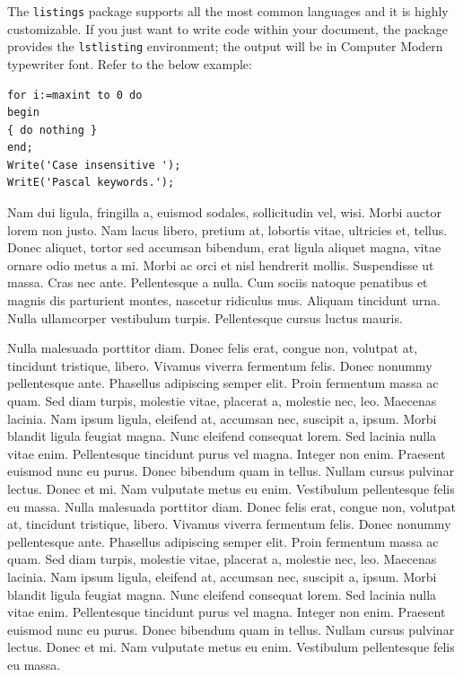 \documentclass[APA,Times1COL]{WileyNJDv5} %
\begin{document}
The {\tt listings} package supports all the most common languages and it is highly customizable. If you just want to write code within your document, the package provides the {\tt lstlisting} environment; the output will be in Computer Modern typewriter font. Refer to the below example:


\begin{lstlisting}[caption={Descriptive caption text},label=DescriptiveLabel, basicstyle=\fontsize{8}{10}\selectfont\ttfamily]
for i:=maxint to 0 do
begin
{ do nothing }
end;
Write('Case insensitive ');
WritE('Pascal keywords.');
\end{lstlisting}




Nam dui ligula, fringilla a, euismod sodales, sollicitudin vel, wisi. Morbi auctor lorem non justo. Nam lacus libero,
pretium at, lobortis vitae, ultricies et, tellus. Donec aliquet, tortor sed accumsan bibendum, erat ligula aliquet magna,
vitae ornare odio metus a mi. Morbi ac orci et nisl hendrerit mollis. Suspendisse ut massa. Cras nec ante. Pellentesque
a nulla. Cum sociis natoque penatibus et magnis dis parturient montes, nascetur ridiculus mus. Aliquam tincidunt
urna. Nulla ullamcorper vestibulum turpis. Pellentesque cursus luctus mauris.

Nulla malesuada porttitor diam. Donec felis erat, congue non, volutpat at, tincidunt tristique, libero. Vivamus
viverra fermentum felis. Donec nonummy pellentesque ante. Phasellus adipiscing semper elit. Proin fermentum massa
ac quam. Sed diam turpis, molestie vitae, placerat a, molestie nec, leo. Maecenas lacinia. Nam ipsum ligula, eleifend
at, accumsan nec, suscipit a, ipsum. Morbi blandit ligula feugiat magna. Nunc eleifend consequat lorem. Sed lacinia
nulla vitae enim. Pellentesque tincidunt purus vel magna. Integer non enim. Praesent euismod nunc eu purus. Donec
bibendum quam in tellus. Nullam cursus pulvinar lectus. Donec et mi. Nam vulputate metus eu enim. Vestibulum
pellentesque felis eu massa.
Nulla malesuada porttitor diam. Donec felis erat, congue non, volutpat at, tincidunt tristique, libero. Vivamus
viverra fermentum felis. Donec nonummy pellentesque ante. Phasellus adipiscing semper elit. Proin fermentum massa
ac quam. Sed diam turpis, molestie vitae, placerat a, molestie nec, leo. Maecenas lacinia. Nam ipsum ligula, eleifend
at, accumsan nec, suscipit a, ipsum. Morbi blandit ligula feugiat magna. Nunc eleifend consequat lorem. Sed lacinia
nulla vitae enim. Pellentesque tincidunt purus vel magna. Integer non enim. Praesent euismod nunc eu purus. Donec
bibendum quam in tellus. Nullam cursus pulvinar lectus. Donec et mi. Nam vulputate metus eu enim. Vestibulum
pellentesque felis eu massa.
\end{document}
